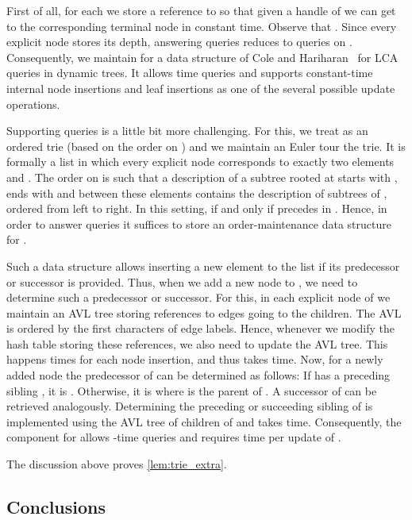 \documentclass[a4paper]{article}
\theoremstyle{remark}
\begin{document}
First of all, for each  we store a reference to  so that given a handle of 
we can get to the corresponding terminal node in constant time.
Observe that .
Since every explicit node stores its depth, answering  queries reduces to  queries on .
Consequently, we maintain for  a data structure of Cole and Hariharan~\cite{Cole:2005} for LCA queries in dynamic trees.
It allows  time queries and supports constant-time internal node insertions and leaf insertions as one of the several possible update operations.

\newcommand{\tbeg}{\mathtt{beg}}
\newcommand{\tend}{\mathtt{end}}

Supporting  queries is a little bit more challenging. For this, we treat  as an ordered trie (based on the order on )
and we maintain an Euler tour the trie. It is formally a list  in which every explicit node  corresponds to exactly two elements  and . The order on  is such that a description of a subtree rooted at  starts with , ends with  and between these elements contains the description of subtrees of , ordered from left to right.
In this setting,  if and only if  precedes  in .
Hence, in order to answer  queries it suffices to store an order-maintenance data structure~\cite{Dietz:1987,Bender:2002} for .

Such a data structure allows inserting a new element to the list if its predecessor or successor is provided.
Thus, when we add a new node to , we need to determine such a predecessor or successor. For this, in each explicit node of 
we maintain an AVL tree storing references to edges going to the children. The AVL is ordered by the first characters of edge labels.
Hence, whenever we modify the hash table storing these references, we also need to update the AVL tree. This happens  times
for each node insertion, and thus takes  time. Now, for a newly added node 
the predecessor of  can be determined as follows: If  has a preceding sibling , it is .
Otherwise, it is  where  is the parent of . A successor of  can be retrieved analogously.
Determining the preceding or succeeding sibling of  is implemented using the AVL tree of children of 
and takes  time.
Consequently, the component for  allows -time queries and requires  time per update of .

The discussion above proves \cref{lem:trie_extra}.

\subsection{Conclusions}\label{sec:trie_conc}
\end{document}
